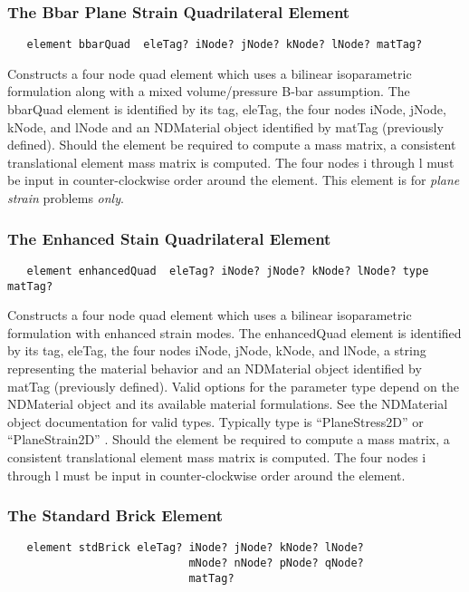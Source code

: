 \documentclass[12pt]{article}
\begin{document}
\subsubsection{The Bbar Plane Strain Quadrilateral Element}
{\sf\small
\begin{verbatim}
   element bbarQuad  eleTag? iNode? jNode? kNode? lNode? matTag? 
\end{verbatim}
}

\noindent Constructs a four node quad
element which uses a bilinear isoparametric formulation along with
a mixed volume/pressure B-bar assumption.
The bbarQuad element is identified by its tag,
eleTag, 
the four nodes iNode, jNode, kNode, and lNode
and an NDMaterial object identified by matTag (previously
defined). 
Should the element be required to compute a mass matrix, a consistent 
translational element mass matrix is computed.
The four nodes i through l must be input in
counter-clockwise order around the element.
This element is for {\em plane strain} problems {\em only}.


\subsubsection{The Enhanced Stain Quadrilateral Element}
{\sf\small
\begin{verbatim}
   element enhancedQuad  eleTag? iNode? jNode? kNode? lNode? type matTag? 
\end{verbatim}
}

\noindent Constructs a four node quad element which uses a bilinear
isoparametric formulation with enhanced strain modes.
The enhancedQuad element is identified by its tag,
eleTag, the four nodes iNode, jNode, kNode, and lNode, 
a string representing the material behavior 
and an NDMaterial object identified by matTag (previously
defined). 
Valid options for the parameter type depend on the
NDMaterial object and its available material formulations. See the
NDMaterial object documentation for valid types. 
Typically type is ``PlaneStress2D'' or ``PlaneStrain2D'' .
Should the element be required to compute a mass matrix, a consistent 
translational element mass matrix is computed.
The four nodes i through l must be input in
counter-clockwise order around the element.



\subsubsection{The Standard Brick Element}
{\sf\small
\begin{verbatim}
   element stdBrick eleTag? iNode? jNode? kNode? lNode? 
                            mNode? nNode? pNode? qNode? 
                            matTag? 
\end{verbatim}
}
\end{document}
